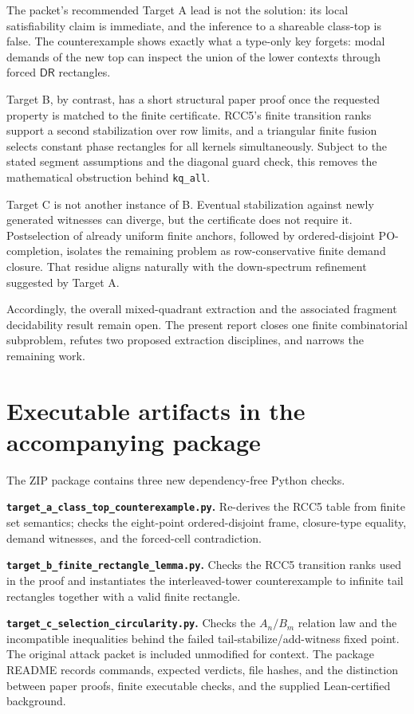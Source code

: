 \documentclass[11pt]{article}
\newcommand{\DR}{\mathsf{DR}}
\begin{document}
The packet's recommended Target A lead is not the solution: its local satisfiability claim
is immediate, and the inference to a shareable class-top is false. The counterexample shows
exactly what a type-only key forgets: modal demands of the new top can inspect the union of
the lower contexts through forced $\DR$ rectangles.

Target B, by contrast, has a short structural paper proof once the requested property is
matched to the finite certificate. RCC5's finite transition ranks support a second
stabilization over row limits, and a triangular finite fusion selects constant phase
rectangles for all kernels simultaneously. Subject to the stated segment assumptions and
the diagonal guard check, this removes the mathematical obstruction behind
\texttt{kq\_all}.

Target C is not another instance of B. Eventual stabilization against newly generated
witnesses can diverge, but the certificate does not require it. Postselection of already
uniform finite anchors, followed by ordered-disjoint PO-completion, isolates the remaining
problem as row-conservative finite demand closure. That residue aligns naturally with the
down-spectrum refinement suggested by Target A.

Accordingly, the overall mixed-quadrant extraction and the associated fragment
decidability result remain open. The present report closes one finite combinatorial
subproblem, refutes two proposed extraction disciplines, and narrows the remaining work.

\appendix
\section{Executable artifacts in the accompanying package}

The ZIP package contains three new dependency-free Python checks.

\textbf{\texttt{target\_a\_class\_top\_counterexample.py}.}
  Re-derives the RCC5 table from finite set semantics; checks the eight-point
  ordered-disjoint frame, closure-type equality, demand witnesses, and the forced-cell
  contradiction.

\textbf{\texttt{target\_b\_finite\_rectangle\_lemma.py}.}
  Checks the RCC5 transition ranks used in the proof and instantiates the interleaved-tower
  counterexample to infinite tail rectangles together with a valid finite rectangle.

\textbf{\texttt{target\_c\_selection\_circularity.py}.}
  Checks the $A_n/B_m$ relation law and the incompatible inequalities behind the failed
  tail-stabilize/add-witness fixed point.
The original attack packet is included unmodified for context. The package README records
commands, expected verdicts, file hashes, and the distinction between paper proofs,
finite executable checks, and the supplied Lean-certified background.
\end{document}
